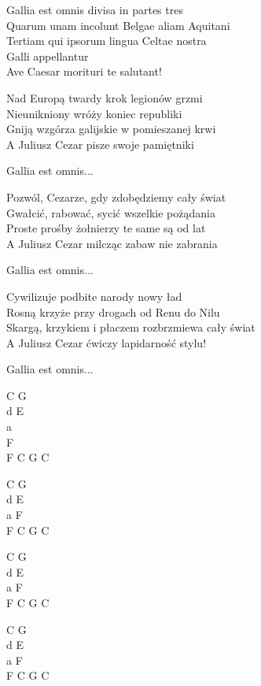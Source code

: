 \begin{text}
	\vin Gallia est omnis divisa in partes tres\\
	\vin Quarum unam incolunt Belgae aliam Aquitani\\
	\vin Tertiam qui ipsorum lingua Celtae nostra\\
	\vin Galli appellantur\\
	\vin Ave Caesar morituri te salutant!

	Nad Europą twardy krok legionów grzmi\\
	Nieunikniony wróży koniec republiki\\
	Gniją wzgórza galijskie w pomieszanej krwi\\
	A Juliusz Cezar pisze swoje pamiętniki

	\vin Gallia est omnis...

	Pozwól, Cezarze, gdy zdobędziemy cały świat\\
	Gwałcić, rabować, sycić wszelkie pożądania\\
	Proste prośby żołnierzy te same są od lat\\
	A Juliusz Cezar milcząc zabaw nie zabrania

	\vin Gallia est omnis...

	Cywilizuje podbite narody nowy ład\\
	Rosną krzyże przy drogach od Renu do Nilu\\
	Skargą, krzykiem i płaczem rozbrzmiewa cały świat\\
	A Juliusz Cezar ćwiczy lapidarność stylu!

	\vin Gallia est omnis...
\end{text}
\begin{chord}
    C G\\
    d E\\
    a\\
    F\\
    F C G C
    
    C G\\
    d E\\
    a F\\
    F C G C\\
    \hfill\break
    
    C G\\
    d E\\
    a F\\
    F C G C\\
    \hfill\break
    
    C G\\
    d E\\
    a F\\
    F C G C
\end{chord}
